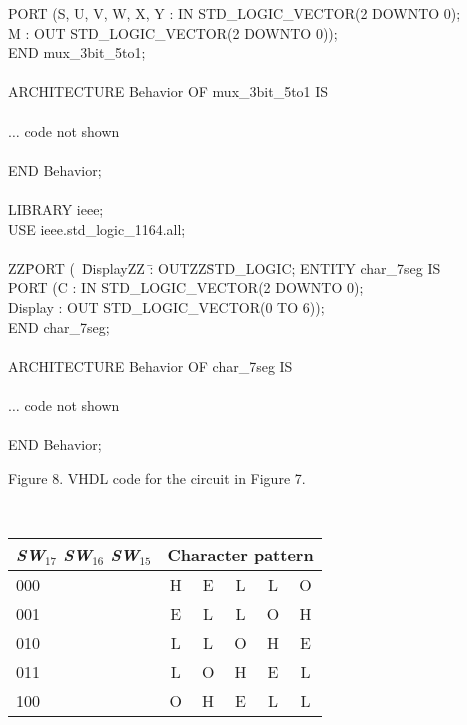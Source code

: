 \documentclass[psfig,10pt,fullpage]{article}
\begin{document}
\begin{center}
\begin{minipage}[t]{12.5 cm}
\begin{tabbing}
\>PORT (\>S, U, V, W, X, Y	\>: IN \>STD\_LOGIC\_VECTOR(2 DOWNTO 0);\\
\>\>M	\>: OUT \>STD\_LOGIC\_VECTOR(2 DOWNTO 0));\\
END mux\_3bit\_5to1;\\
~\\
ARCHITECTURE Behavior OF mux\_3bit\_5to1 IS\\
~\\
\>$\ldots$ code not shown\\
~\\
END Behavior;\\
~\\
LIBRARY ieee;\\
USE ieee.std\_logic\_1164.all;\\
~\\
ZZ\=PORT (~\=DisplayZZ \=: OUTZZ\=STD\_LOGIC;\kill
ENTITY char\_7seg IS\\
\>PORT (\>C \>: IN \>STD\_LOGIC\_VECTOR(2 DOWNTO 0);\\
\>\>Display	\>: OUT \>STD\_LOGIC\_VECTOR(0 TO 6));\\
END char\_7seg;\\
~\\
ARCHITECTURE Behavior OF char\_7seg IS\\
~\\
\>$\ldots$ code not shown\\
~\\
END Behavior;
\end{tabbing}
\end{minipage}
\end{center}

\begin{center}
Figure 8. VHDL code for the circuit in Figure 7.
\end{center}

~\\
\begin{center}
\begin{tabular}{l|ccccc}
{\it SW}$_{17}$ {\it SW}$_{16}$ {\it SW}$_{15}$ & \multicolumn{5}{c}{Character pattern} \\
\hline
\hspace{8.0 mm} {\rule[0mm]{0mm}{5mm}000} & H & E & L & L & O\\ 
\hspace{8.0 mm} 001 & E & L & L & O & H\\
\hspace{8.0 mm} 010 & L & L & O & H & E\\
\hspace{8.0 mm} 011 & L & O & H & E & L\\
\hspace{8.0 mm} 100 & O & H & E & L & L\\
\end{tabular}
\end{center}
\end{document}
